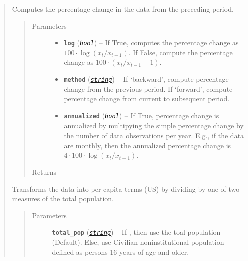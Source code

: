 \documentclass[letterpaper,10pt,openany,oneside]{sphinxmanual}
\begin{document}
\begin{fulllineitems}
\begin{quote}
\begin{fulllineitems}
\label{series_class:fredpy.series.pc}
Computes the percentage change in the data from the preceding period.
\begin{quote}\begin{description}
\item[{Parameters}] \leavevmode\begin{itemize}
\item {} 
\textbf{\texttt{log}} (\href{https://docs.python.org/library/functions.html\#bool}{\emph{\texttt{bool}}}) -- If True, computes the percentage change as \(100\cdot\log(x_{t}/x_{t-1})\). If False, compute the percentage change as \(100\cdot\left( x_{t}/x_{t-1} - 1\right)\).

\item {} 
\textbf{\texttt{method}} (\href{https://docs.python.org/library/string.html\#module-string}{\emph{\texttt{string}}}) -- If `backward', compute percentage change from the previous period. If `forward', compute percentage change from current to subsequent period.

\item {} 
\textbf{\texttt{annualized}} (\href{https://docs.python.org/library/functions.html\#bool}{\emph{\texttt{bool}}}) -- If True, percentage change is annualized by multipying the simple percentage change by the number of data observations per year. E.g., if the data are monthly, then the annualized percentage change is \(4\cdot 100\cdot\log(x_{t}/x_{t-1})\).

\end{itemize}

\item[{Returns}] \leavevmode
{\hyperref[series_class:fredpy.series]{}}

\end{description}\end{quote}

\end{fulllineitems}


\begin{fulllineitems}
\label{series_class:fredpy.series.percapita}
Transforms the data into per capita terms (US) by dividing by one of two measures of the total population.
\begin{quote}\begin{description}
\item[{Parameters}] \leavevmode
\textbf{\texttt{total\_pop}} (\href{https://docs.python.org/library/string.html\#module-string}{\emph{\texttt{string}}}) -- If , then use the toal population (Default). Else, use Civilian noninstitutional population defined as persons 16 years of age and older.


\end{description}
\end{quote}
\end{fulllineitems}
\end{quote}
\end{fulllineitems}
\end{document}
